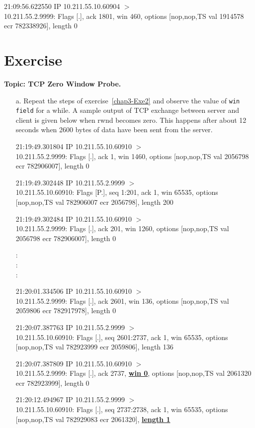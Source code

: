 \begin{multicols}{2}
\begin{itemize}
21:09:56.622550 IP 10.211.55.10.60904 $>$\\ 10.211.55.2.9999: Flags [.], ack 1801, win 460, options [nop,nop,TS val 1914578 ecr 782338926], length 0
\end{itemize}


\section{Exercise}\label{chap3-Exe3}

\textbf{Topic: TCP Zero Window Probe.}
\begin{itemize}
\item[a.]  Repeat the steps of exercise~\ref{chap3-Exe2} and observe the value of \texttt{win field} for a while. A sample output of TCP exchange between server and client is given below when rwnd becomes zero. This happens after about 12 seconds when 2600 bytes of data have been sent from the server. 

21:19:49.301804 IP 10.211.55.10.60910 $>$\\ 10.211.55.2.9999: Flags [.], ack 1, win 1460, options [nop,nop,TS val 2056798 ecr 782906007], length 0

21:19:49.302448 IP 10.211.55.2.9999 $>$\\ 10.211.55.10.60910: Flags [P.], seq 1:201, ack 1, win 65535, options [nop,nop,TS val 782906007 ecr 2056798], length 200

21:19:49.302484 IP 10.211.55.10.60910 $>$\\ 10.211.55.2.9999: Flags [.], ack 201, win 1260, options [nop,nop,TS val 2056798 ecr 782906007], length 0

:\\
:\\
:

21:20:01.334506 IP 10.211.55.10.60910 $>$\\ 10.211.55.2.9999: Flags [.], ack 2601, win 136, options [nop,nop,TS val 2059806 ecr 782917978], length 0

21:20:07.387763 IP 10.211.55.2.9999 $>$\\ 10.211.55.10.60910: Flags [.], seq 2601:2737, ack 1, win 65535, options [nop,nop,TS val 782923999 ecr 2059806], length 136

21:20:07.387809 IP 10.211.55.10.60910 $>$\\ 10.211.55.2.9999: Flags [.], ack 2737, \underline{\textbf{win 0}}, options [nop,nop,TS val 2061320 ecr 782923999], length 0

21:20:12.494967 IP 10.211.55.2.9999 $>$\\ 10.211.55.10.60910: Flags [.], seq 2737:2738, ack 1, win 65535, options [nop,nop,TS val 782929083 ecr 2061320], \underline{\textbf{length 1}}


\end{itemize}
\end{multicols}
